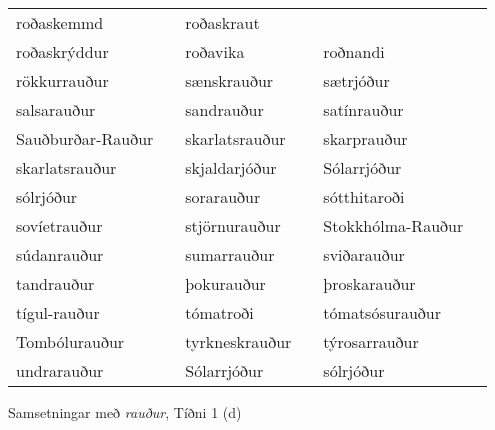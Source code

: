 \documentclass[../samsetningasafn.tex]{subfiles}
\begin{document}
\begin{wordlist}[H]
\begin{tcolorbox}
\begin{tabular}{BlBlBl}
		roðaskemmd		&		& 
		roðaskraut		&		\\  %
		roðaskrýddur		&		& 
		roðavika			&		& 
		roðnandi			&		\\  %
		rökkurrauður		&		& 
		sænskrauður		&		& 
		sætrjóður		&		\\  %
		salsarauður		&		& 
		sandrauður		&		& 
		satínrauður		&		\\  %
		Sauðburðar-Rauður & 	& 
		skarlatsrauður	&		& 
		skarprauður		&		\\  %
		skarlatsrauður	&		& 
		skjaldarjóður		&		& 
		Sólarrjóður		&		\\  %
		sólrjóður		&		& 
		sorarauður		&		& 
		sótthitaroði		&		\\  %
		sovíetrauður		&		& 
		stjörnurauður	&		& 
		Stokkhólma-Rauður & 	\\  %
		súdanrauður		&		& 
		sumarrauður		&		& 
		sviðarauður		&		\\  %
		tandrauður		&		& 
		þokurauður		&		& 
		þroskarauður		&		\\  %
		tígul-rauður		&		& 
		tómatroði		&		& 
		tómatsósurauður	&		\\  %
		Tombólurauður	&		& 
		tyrkneskrauður	&		& 
		týrosarrauður	&		\\  %
		undrarauður		&		& 
		Sólarrjóður		&		& 
		sólrjóður		&		  %
	\end{tabular}

\end{tcolorbox}
	\caption{Samsetningar með \textit{rauður}, Tíðni 1 (d)}
	\label{listi:rautt.1d}
\end{wordlist}		
		
\end{document}
